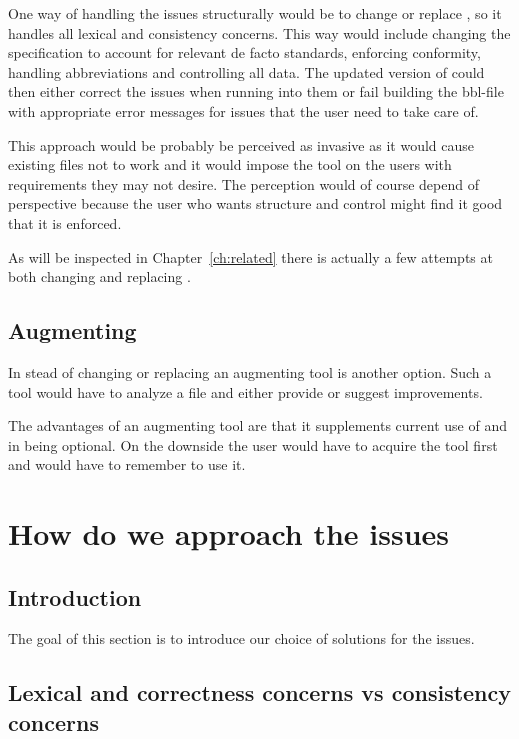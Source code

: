 One way of handling the issues structurally would be to change or
replace {\bibtex}, so it handles all lexical and consistency concerns.
This way would include changing the {\bibtex} specification to account
for relevant de facto standards, enforcing conformity, handling
abbreviations and controlling all data.  The updated version of
{\bibtex} could then either correct the issues when running into them
or fail building the bbl-file with appropriate error messages for
issues that the user need to take care of.

This approach would be probably be perceived as invasive as it would
cause existing {\bibtex} files not to work and it would impose the
tool on the users with requirements they may not desire.  The
perception would of course depend of perspective because the user who
wants structure and control might find it good that it is enforced.

As will be inspected in Chapter~\ref{ch:related} there is actually a
few attempts at both changing and replacing {\bibtex}.


\subsection{Augmenting {\bibtex}}

In stead of changing or replacing {\bibtex} an augmenting tool is
another option.  Such a tool would have to analyze a {\bibtex} file
and either provide or suggest improvements.

The advantages of an augmenting tool are that it supplements current
use of {\bibtex} and in being optional.  On the downside the user
would have to acquire the tool first and would have to remember to use
it.


\section{How do we approach the {\bibtex} issues}
\subsection{Introduction}

The goal of this section is to introduce our choice of solutions for
the issues.


\subsection{Lexical and correctness concerns vs consistency concerns}
\label{sec:approach_lexical_consistency}

